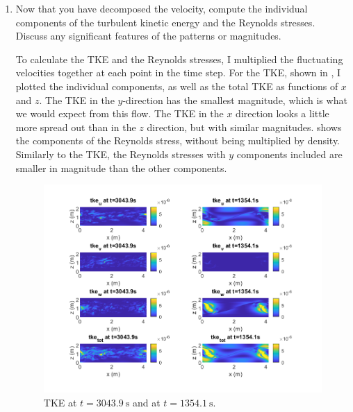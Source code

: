 \documentclass[11pt]{article}
\begin{document}
\begin{enumerate}
\begin{enumerate}
			
			\clearpage
			\item Now that you have decomposed the velocity, compute the individual components of the turbulent kinetic energy and the Reynolds stresses. Discuss any significant features of the patterns or magnitudes.\par
			
			To calculate the TKE and the Reynolds stresses, I multiplied the fluctuating velocities together at each point in the time step. For the TKE, shown in , I plotted the individual components, as well as the total TKE as functions of $x$ and $z$. The TKE in the $y$-direction has the smallest magnitude, which is what we would expect from this flow. The TKE in the $x$ direction looks a little more spread out than in the $z$ direction, but with similar magnitudes.  shows the components of the Reynolds stress, without being multiplied by density. Similarly to the TKE, the Reynolds stresses with $y$ components included are smaller in magnitude than the other components.
			
			\begin{figure}[htpb]
				\centering
				\includegraphics[width=\textwidth]{1-plots/tke_plot_3043_1354.png}
				\caption{TKE at $t=\SI{3043.9}{\second}$ and at $t=\SI{1354.1}{\second}$.}
				\label{fig:tke}
			\end{figure}
		

\end{enumerate}
\end{enumerate}
\end{document}
